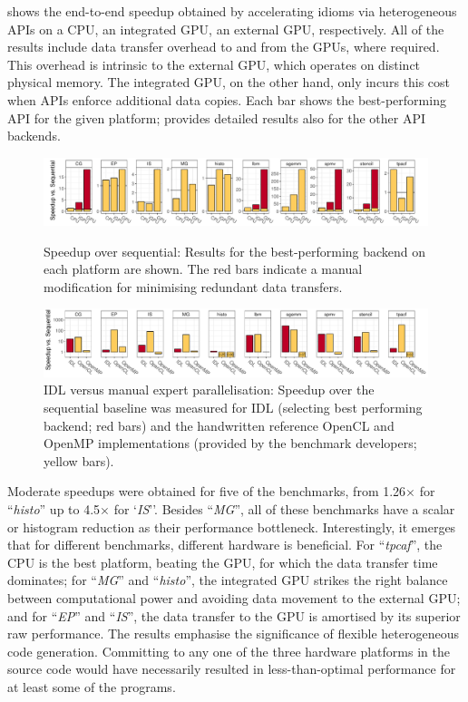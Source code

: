     shows the end-to-end speedup obtained by
    accelerating idioms via heterogeneous APIs on a CPU, an integrated GPU,
    an external GPU, respectively.
    All of the results include data transfer overhead to and from the GPUs,
    where required.
    This overhead is intrinsic to the external GPU, which operates on distinct
    physical memory.
    The integrated GPU, on the other hand, only incurs this cost when APIs
    enforce additional data copies.
    Each bar shows the best-performing API for the given platform;
     provides detailed results also for the other
    API backends.

\begin{figure}[t]
  \centering
  \includegraphics[width=\textwidth]{figures/asplos_speedup.pdf}
  \caption{Speedup over sequential:
           Results for the best-performing backend on each platform are shown.
           The red bars indicate a manual modification for minimising redundant
           data transfers.}
  \label{fig:speedup-figure}
  \vspace{1.5em}
  \centering
  \includegraphics[width=\textwidth]{figures/asplos_comparison.pdf}
  \caption{IDL versus manual expert parallelisation:
           Speedup over the sequential baseline was measured for IDL
           (selecting best performing backend; red bars) and the
           handwritten reference OpenCL and OpenMP implementations
           (provided by the benchmark developers; yellow bars).}
  \label{fig:speedup-figure-2}
  \vspace{0.5em}
\end{figure}

    Moderate speedups were obtained for five of the benchmarks, from
    1.26$\times$ for ``\emph{histo}'' up to 4.5$\times$ for `\emph{IS}''.
    Besides ``\emph{MG}'', all of these benchmarks have a scalar or histogram
    reduction as their performance bottleneck.
    Interestingly, it emerges that for different benchmarks, different hardware
    is beneficial.
    For ``\emph{tpcaf}'', the CPU is the best platform, beating the GPU,
    for which the data transfer time dominates;
    for ``\emph{MG}'' and ``\emph{histo}'', the integrated GPU strikes the right
    balance between computational power and avoiding data movement to the
    external GPU;
    and for ``\emph{EP}'' and ``\emph{IS}'', the data transfer to the GPU is
    amortised by its superior raw performance.
    The results emphasise the significance of flexible heterogeneous
    code generation.
    Committing to any one of the three hardware platforms in the source code
    would have necessarily resulted in less-than-optimal performance for at
    least some of the programs.

